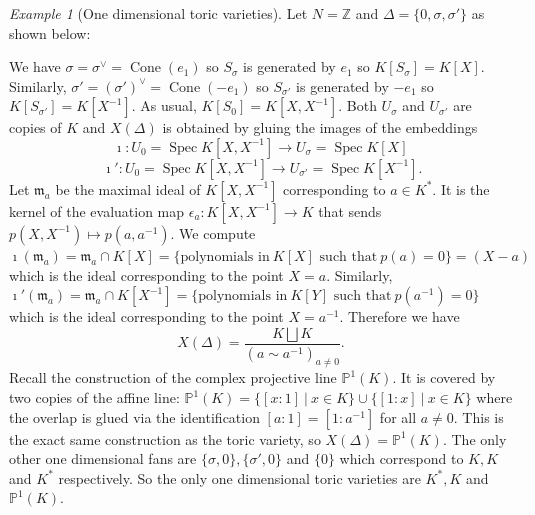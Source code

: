 \documentclass[BSc]{usydthesis}
\numberwithin{equation}{chapter}
\theoremstyle{remark}
\newtheorem{Example}[equation]{Example}
\newcommand{\Z}{\mathbb{Z}}
\newcommand{\Proj}{\mathbb{P}}
\newcommand{\V}{\vee}
\newcommand{\m}{\mathfrak{m}}
\DeclareMathOperator{\Cone}{Cone}
\DeclareMathOperator{\Spec}{Spec}
\begin{document}
\begin{Example}[One dimensional toric varieties]\label{OneDim}
Let $N=\Z$ and $\Delta = \{0, \sigma, \sigma'\}$ as shown below:
\begin{figure}[ht]
  \centering
\end{figure}

We have $\sigma = \sigma^{\V} = \Cone(e_1)$ so $S_{\sigma}$ is generated by $e_1$ so $K[S_{\sigma}] = K[X].$ Similarly, $\sigma' = (\sigma')^{\V} =\Cone(-e_1)$ so $S_{\sigma'}$ is generated by $-e_1$ so $K[S_{\sigma'}]=K[X^{-1}].$ As usual, $K[S_{0}] = K[X,X^{-1}].$ Both $U_{\sigma}$ and $U_{\sigma'}$ are copies of $K$ and $X(\Delta)$ is obtained by gluing the images of the embeddings $$ \imath : U_0 = \Spec K[X,X^{-1}] \to U_{\sigma} = \Spec K[X] $$ $$ \ \imath': U_{0} = \Spec K[X,X^{-1}] \to U_{\sigma'} = \Spec K[X^{-1}] . $$ Let $\m_a$ be the maximal ideal of $K[X,X^{-1}]$ corresponding to $a\in K^*.$ It is the kernel of the evaluation map $\epsilon_a: K[X,X^{-1}] \to K$ that sends $p(X,X^{-1}) \mapsto p(a,a^{-1}).$ We compute $\imath(\m_a) = \m_a \cap K[X] = \{ \text{polynomials in} \ K[X] \text{ such that} \ p(a)=0 \} = (X-a)$ which is the ideal corresponding to the point $X=a.$ Similarly, $\imath'(\m_a) = \m_a \cap K[X^{-1}] = \{ \text{polynomials in} \ K[Y] \text{ such that} \ p(a^{-1})=0 \}$ which is the ideal corresponding to the point $X=a^{-1}.$ Therefore we have $$X(\Delta) = \frac{ K \bigsqcup K}{ (a \sim a^{-1})_{a\neq 0} }.$$ Recall the construction of the complex projective line $\Proj^1(K).$ It is covered by two copies of the affine line: $\Proj^1(K) = \{ [x:1] \ | \ x\in K \} \cup \{ [1:x] \ | \ x\in K \}$ where the overlap is glued via the identification $[a:1] = [1:a^{-1}]$ for all $a\neq 0.$ This is the exact same construction as the toric variety, so $X(\Delta) = \Proj^1(K).$ The only other one dimensional fans are $\{\sigma, 0 \} , \{ \sigma', 0 \}$ and $\{ 0\}$ which correspond to $K, K $ and $K^*$ respectively. So the only one dimensional toric varieties are $K^*, K$ and $\Proj^1(K).$
\end{Example}
\end{document}

